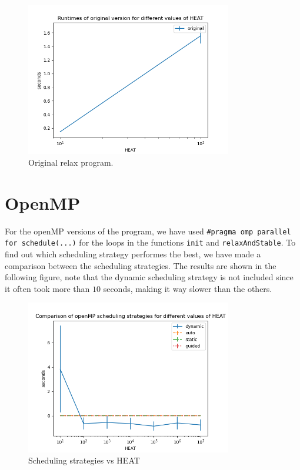 \documentclass[a4paper]{article}
\begin{document}
\begin{figure}[H]
    \centering
    \includegraphics[width = 0.8\textwidth]{graphs/heat/Runtimes of original version for different values of HEAT.png}
    \caption{Original relax program.}
    \label{fig: orig heat}
\end{figure}

\section{OpenMP}
For the openMP versions of the program, we have used \texttt{\#pragma omp parallel for schedule(...)} for the loops in the functions \texttt{init} and \texttt{relaxAndStable}. To find out which scheduling strategy performes the best, we have made a comparison between the scheduling strategies. The results are shown in the following figure, note that the dynamic scheduling strategy is not included since it often took more than $10$ seconds, making it way slower than the others.

\begin{figure}[H]
    \centering
    \includegraphics[width = 0.8\textwidth]{graphs/heat/Comparison of openMP scheduling strategies for different values of HEAT.png}
    \caption{Scheduling strategies vs HEAT}
    \label{fig: orig heat}
\end{figure}
\end{document}
